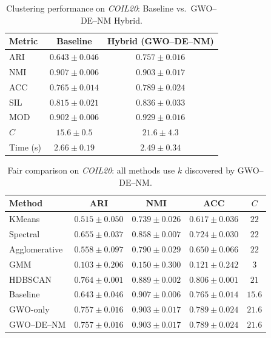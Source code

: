 \begin{table}[htbp]
\centering
\caption{Clustering performance on \textit{COIL20}: Baseline vs.\ GWO--DE--NM Hybrid.}
\label{tab:coil20}
\begin{tabular}{lcc}
\toprule
Metric & Baseline & Hybrid (GWO--DE--NM) \\
\midrule
ARI & $0.643 \pm 0.046$ & $\mathbf{0.757 \pm 0.016}$ \\
NMI & $\mathbf{0.907 \pm 0.006}$ & $0.903 \pm 0.017$ \\
ACC & $0.765 \pm 0.014$ & $\mathbf{0.789 \pm 0.024}$ \\
SIL & $0.815 \pm 0.021$ & $\mathbf{0.836 \pm 0.033}$ \\
MOD & $0.902 \pm 0.006$ & $\mathbf{0.929 \pm 0.016}$ \\
\midrule
$C$ & $15.6 \pm 0.5$ & $21.6 \pm 4.3$ \\
Time (s) & $2.66 \pm 0.19$ & $2.49 \pm 0.34$ \\
\bottomrule
\end{tabular}
\end{table}

\begin{table}[htbp]
\centering\small
\caption{Fair comparison on \textit{COIL20}: all methods use $k$ discovered by GWO--DE--NM.}
\label{tab:fair_coil20}
\begin{tabular}{lcccc}
\toprule
Method & ARI & NMI & ACC & $C$ \\
\midrule
KMeans & $0.515 \pm 0.050$ & $0.739 \pm 0.026$ & $0.617 \pm 0.036$ & $22$ \\
Spectral & $0.655 \pm 0.037$ & $0.858 \pm 0.007$ & $0.724 \pm 0.030$ & $22$ \\
Agglomerative & $0.558 \pm 0.097$ & $0.790 \pm 0.029$ & $0.650 \pm 0.066$ & $22$ \\
GMM & $0.103 \pm 0.206$ & $0.150 \pm 0.300$ & $0.121 \pm 0.242$ & $3$ \\
HDBSCAN & $\mathbf{0.764 \pm 0.001}$ & $0.889 \pm 0.002$ & $0.806 \pm 0.001$ & $21$ \\
\midrule
Baseline & $0.643 \pm 0.046$ & $0.907 \pm 0.006$ & $0.765 \pm 0.014$ & $15.6$ \\
GWO-only & $0.757 \pm 0.016$ & $0.903 \pm 0.017$ & $0.789 \pm 0.024$ & $21.6$ \\
GWO--DE--NM & $0.757 \pm 0.016$ & $0.903 \pm 0.017$ & $0.789 \pm 0.024$ & $21.6$ \\
\bottomrule
\end{tabular}
\end{table}

